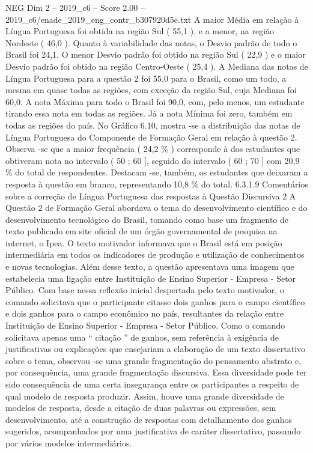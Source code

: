 \begin{textsample}{NEG Dim 2 – 2019\_c6 – Score 2.00 – 2019\_c6/enade\_2019\_eng\_contr\_b307920d5e.txt}
A maior Média em relação à Língua Portuguesa foi obtida na região Sul ( 55,1 ), e a menor, na região Nordeste ( 46,0 ).
Quanto à variabilidade das notas, o Desvio padrão de todo o Brasil foi 24,1.
O menor Desvio padrão foi obtido na região Sul ( 22,9 ) e o maior Desvio padrão foi obtido na região Centro-Oeste ( 25,4 ).
A Mediana das notas de Língua Portuguesa para a questão 2 foi 55,0 para o Brasil, como um todo, a mesma em quase todas as regiões, com exceção da região Sul, cuja Mediana foi 60,0.
A nota Máxima para todo o Brasil foi 90,0, com, pelo menos, um estudante tirando essa nota em todas as regiões.
Já a nota Mínima foi zero, também em todas as regiões do país.
No Gráfico 6.10, mostra -se a distribuição das notas de Língua Portuguesa do Componente de Formação Geral em relação à questão 2.
Observa -se que a maior frequência ( 24,2 \% ) corresponde à dos estudantes que obtiveram nota no intervalo ( 50 ; 60 ], seguido do intervalo ( 60 ; 70 ] com 20,9 \% do total de respondentes.
Destacam -se, também, os estudantes que deixaram a resposta à questão em branco, representando 10,8 \% do total. 6.3.1.9 Comentários sobre a correção de Língua Portuguesa das respostas à Questão Discursiva 2 A Questão 2 de Formação Geral abordava o tema do desenvolvimento científico e do desenvolvimento tecnológico do Brasil, tomando como base um fragmento de texto publicado em site oficial de um órgão governamental de pesquisa na internet, o Ipea.
O texto motivador informava que o Brasil está em posição intermediária em todos os indicadores de produção e utilização de conhecimentos e novas tecnologias.
Além desse texto, a questão apresentava uma imagem que estabelecia uma ligação entre Instituição de Ensino Superior - Empresa - Setor Público.
Com base nessa reflexão inicial despertada pelo texto motivador, o comando solicitava que o participante citasse dois ganhos para o campo científico e dois ganhos para o campo econômico no país, resultantes da relação entre Instituição de Ensino Superior - Empresa - Setor Público.
Como o comando solicitava apenas uma “ citação ” de ganhos, sem referência à exigência de justificativas ou explicações que ensejariam a elaboração de um texto dissertativo sobre o tema, observou -se uma grande fragmentação do pensamento abstrato e, por consequência, uma grande fragmentação discursiva.
Essa diversidade pode ter sido consequência de uma certa insegurança entre os participantes a respeito de qual modelo de resposta produzir.
Assim, houve uma grande diversidade de modelos de resposta, desde a citação de duas palavras ou expressões, sem desenvolvimento, até a construção de respostas com detalhamento dos ganhos sugeridos, acompanhados por uma justificativa de caráter dissertativo, passando por vários modelos intermediários.

\end{textsample}

